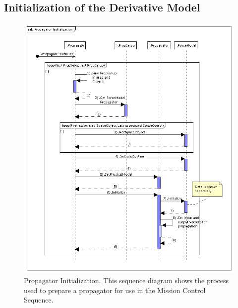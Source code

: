 \subsection{Initialization of the Derivative Model}


\begin{figure}[htb]
\begin{center}
\includegraphics[350,415]{Images/PropagatorInitialization.png}
\caption[Propagator Initialization]{\label{figure:PropagatorInitialization}Propagator
Initialization.  This sequence diagram shows the process used to prepare a propagator for use in
the Mission Control Sequence.}
\end{center}
\end{figure}


